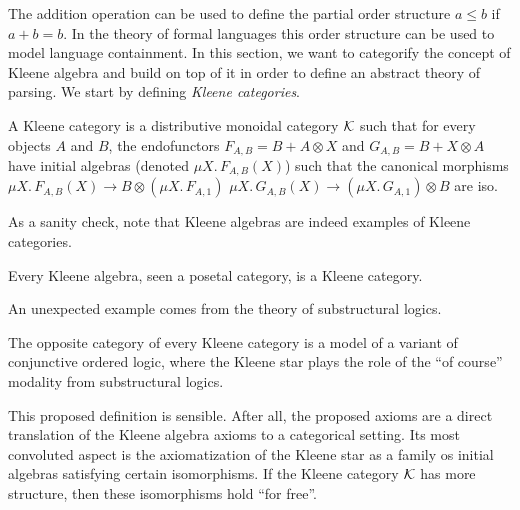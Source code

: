 \documentclass[acmsmall,anonymous,review,screen]{acmart}
\newcommand{\cat}[1]{
  \relax
  \StrLen{#1}[\arglength]
  \ifnum\arglength=1
  \mathcal{#1}
  \else
  \mathbf{#1}
  \fi
}
\begin{document}
The addition operation can be used to define the partial order
structure $a \leq b$ if $a + b = b$. In the theory of formal languages
this order structure can be used to model language containment. In this
section, we want to categorify the concept of Kleene algebra and
build on top of it in order to define an abstract theory of parsing.
We start by defining \emph{Kleene categories}.

\begin{definition}
  A Kleene category is a distributive monoidal category $\cat{K}$
  such that for every objects $A$ and $B$, the endofunctors $F_{A, B}
  = B + A \otimes X$ and $G_{A, B} = B + X \otimes A$ have initial
  algebras (denoted $\mu X.\, F_{A, B}(X)$) such that the canonical
  morphisms $\mu X.\, F_{A, B}(X) \to B \otimes (\mu   X.\, F_{A, 1})$
  $\mu X.\, G_{A, B}(X) \to (\mu   X.\, G_{A, 1})\otimes B $ are iso.
\end{definition}

As a sanity check, note that Kleene algebras are indeed examples of
Kleene categories.

\begin{example}
  Every Kleene algebra, seen a posetal category, is a Kleene category.
\end{example}

An unexpected example comes from the theory of substructural logics.

\begin{example}
  The opposite category of every Kleene category is a model of a variant of
  conjunctive ordered logic, where the Kleene star plays the role of the ``of
  course'' modality from substructural logics.
\end{example}

This proposed definition is sensible. After all, the proposed axioms
are a direct translation of the Kleene algebra axioms to a categorical
setting. Its most convoluted aspect is the axiomatization of the Kleene
star as a family os initial algebras satisfying certain
isomorphisms. If the Kleene category $\cat{K}$ has more structure,
then these isomorphisms hold ``for free''.
\end{document}
